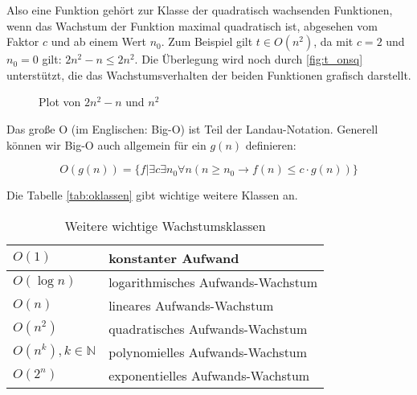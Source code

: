 Also eine Funktion gehört zur Klasse der quadratisch wachsenden Funktionen,
wenn das Wachstum der Funktion maximal quadratisch ist,
abgesehen vom Faktor $c$ und ab einem Wert $n_0$.
Zum Beispiel gilt $t \in O(n^2)$, da mit $c=2$ und $n_0 = 0$ gilt: $2n^2 -n \leq 2n^2$.
Die Überlegung wird noch durch \autoref{fig:t_onsq} unterstützt,
die das Wachstumsverhalten der beiden Funktionen grafisch darstellt.

\begin{figure}[h]
    \caption{Plot von $2n^2 - n$ und $n^2$}
    \centering
    \label{fig:t_onsq}
\end{figure}


Das große O (im Englischen: Big-O) ist Teil der Landau-Notation.
Generell können wir Big-O auch allgemein für ein $g(n)$ definieren:

\[
O(g(n)) = \{f|\exists c \exists n_0 \forall n (n \geq n_0 \rightarrow f(n) \leq c \cdot g(n))\}
\]

Die Tabelle \autoref{tab:oklassen} gibt wichtige weitere Klassen an.

\begin{table}[ht]
    \caption{Weitere wichtige Wachstumsklassen}
    \centering
    \begin{tabular}{l l}
        \toprule
        $O(1)$ & konstanter Aufwand \\
        \midrule
        $O(\log n)$ & logarithmisches Aufwands-Wachstum \\
        \midrule
        $O(n)$ & lineares Aufwands-Wachstum \\
        \midrule
        $O(n^2)$ & quadratisches Aufwands-Wachstum \\
        \midrule
        $O(n^k),  k \in \mathbb{N}$ & polynomielles Aufwands-Wachstum \\
        \midrule
        $O(2^n)$ & exponentielles Aufwands-Wachstum \\
    \bottomrule
    \bottomrule
    \end{tabular}%
    \label{tab:oklassen}
\end{table}

